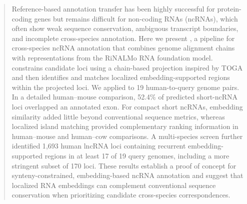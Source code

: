 \begin{abstract}
Reference-based annotation transfer has been highly successful for
protein-coding genes but remains difficult for non-coding RNAs (ncRNAs), which
often show weak sequence conservation, ambiguous transcript boundaries, and
incomplete cross-species annotation. Here we present \curia{}, a pipeline for
cross-species ncRNA annotation that combines genome alignment chains with
representations from the RiNALMo RNA foundation model. \curia{} constrains
candidate loci using a chain-based projection inspired by TOGA and then
identifies and matches localized embedding-supported regions within the
projected loci.
We applied \curia{} to 19 human-to-query genome pairs. In a detailed
human--mouse comparison, 52.4\% of predicted short-ncRNA loci overlapped an
annotated exon. For compact short ncRNAs, embedding similarity added little
beyond conventional sequence metrics, whereas localized island matching
provided complementary ranking information in human--mouse and human--cow
comparisons. A multi-species screen further identified 1{,}693 human lncRNA
loci containing recurrent embedding-supported regions in at least 17 of 19
query genomes, including a more stringent subset of 170 loci.
These results establish a proof of concept for synteny-constrained,
embedding-based ncRNA annotation and suggest that localized RNA embeddings can
complement conventional sequence conservation when prioritizing candidate
cross-species correspondences.
\end{abstract}
